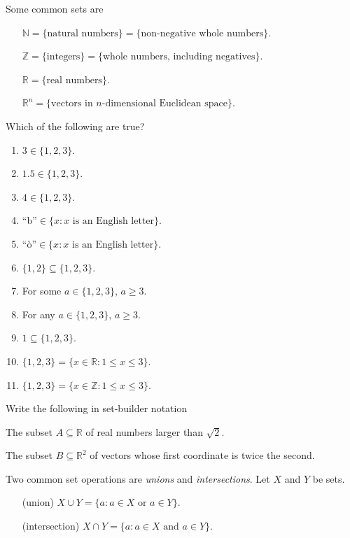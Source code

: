 \documentclass{problemset}
\newcommand{\R}{\mathbb{R}}
\newcommand{\Z}{\mathbb{Z}}
\newcommand{\N}{\mathbb{N}}
\begin{document}
	\begin{definition}
		Some common sets are
		\begin{itemize}
			\item[] $\N=\{\text{natural numbers}\} = \{\text{non-negative whole numbers}\}$.
			\item[] $\Z=\{\text{integers}\} = \{\text{whole numbers, including negatives}\}$.
			\item[] $\R=\{\text{real numbers}\}$.
			\item[] $\R^n=\{\text{vectors in $n$-dimensional Euclidean space}\}$.
		\end{itemize}
	\end{definition}


	\question
	\begin{parts}
		\item Which of the following are true?
		\begin{enumerate}
			\item $3\in\{1,2,3\}$.
			\item $1.5\in\{1,2,3\}$.
			\item $4\in\{1,2,3\}$.
			\item ``b''$\in\{x:x\text{ is an English letter}\}$.
			\item ``\`o''$\in\{x:x\text{ is an English letter}\}$.
			\item $\{1,2\}\subseteq \{1,2,3\}$.
			\item For some $a\in\{1,2,3\}$, $a \geq 3$.
			\item For any $a\in\{1,2,3\}$, $a\geq 3$.
			\item $1\subseteq\{1,2,3\}$.
			\item $\{1,2,3\}=\{x\in\R:1\leq x\leq 3\}$.
			\item $\{1,2,3\}=\{x\in\Z:1\leq x\leq 3\}$.
		\end{enumerate}
	\end{parts}

	\question
		Write the following in set-builder notation
	\begin{parts}
			\item The subset $A\subseteq \R$ of real numbers larger than $\sqrt{2}$.
			\item The subset $B\subseteq \R^2$ of vectors whose first coordinate
			is twice the second.
	\end{parts}

	\begin{definition}
		Two common set operations are \emph{unions} and \emph{intersections}.  
		Let $X$ and $Y$ be sets.

		\hfill\begin{minipage}{\dimexpr\textwidth-3cm}
		\begin{itemize}
			\item[(union)] $X\cup Y = \{a:a\in X\text{ or }a\in Y\}$.
			\item[(intersection)] $X\cap Y = \{a: a\in X\text{ and }a\in Y\}$.
		\end{itemize}
		\end{minipage}
	\end{definition}
\end{document}
